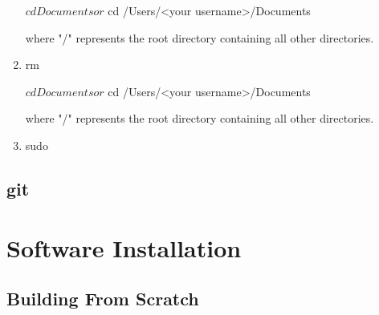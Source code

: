 \documentclass{article}
\begin{document}
\begin{enumerate}
\begin{script}
			$ cd Documents
			or
			$ cd /Users/<your username>/Documents
	
			where "/" represents the root directory containing all other directories.
		
	\end{script}
	\item rm 
	\begin{script}
		
			$ cd Documents
			or
			$ cd /Users/<your username>/Documents
	
			where "/" represents the root directory containing all other directories.
		
	\end{script}
	\item sudo


\end{enumerate}
\subsection{git}


\section{Software Installation}

\subsection{Building From Scratch}
\end{document}
